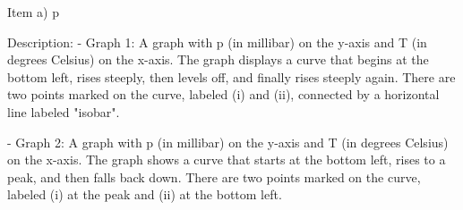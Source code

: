 Item a) p

Description:
- Graph 1: A graph with p (in millibar) on the y-axis and T (in degrees Celsius) on the x-axis. The graph displays a curve that begins at the bottom left, rises steeply, then levels off, and finally rises steeply again. There are two points marked on the curve, labeled (i) and (ii), connected by a horizontal line labeled "isobar".
  
- Graph 2: A graph with p (in millibar) on the y-axis and T (in degrees Celsius) on the x-axis. The graph shows a curve that starts at the bottom left, rises to a peak, and then falls back down. There are two points marked on the curve, labeled (i) at the peak and (ii) at the bottom left.
